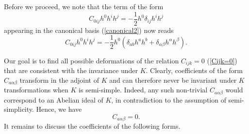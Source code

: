 \documentclass[a4paper,11pt]{article}
\begin{document}
Before we proceed, we note that the term of the form
\begin{displaymath}
C_{0ij}h^{0}h^{i}h^{j}=-\frac{1}{2} h^{0}\delta_{ij}h^{i}h^{j}
\end{displaymath}
appearing in the canonical basis (\ref{canonical2}) now
reads
\begin{equation}\label{deltaij}
C_{0ij}h^{0}h^{i}h^{j}=-\frac{1}{2}h^{0}(\delta_{ab}h^{a}h^{b}
+\delta_{\alpha\beta}h^{\alpha}h^{\beta}).
\end{equation}

Our goal is to find all possible deformations of the relation
$C_{ijk}=0$ (\ref{Cijk=0}) that are consistent with the
invariance under $K$. Clearly, coefficients of the form
$C_{a\alpha\beta}$ transform in the adjoint of $K$ and can
therefore never be invariant under $K$ transformations when $K$ is
semi-simple. Indeed, any such non-trivial $C_{a\alpha\beta}$ would
correspond to an Abelian ideal of $K$, in contradiction to the assumption
of semi-simplicity. Hence, we have
\begin{equation}
C_{a\alpha\beta}=0.
\end{equation}
It remains to discuss the coefficients of the following forms.
\end{document}
